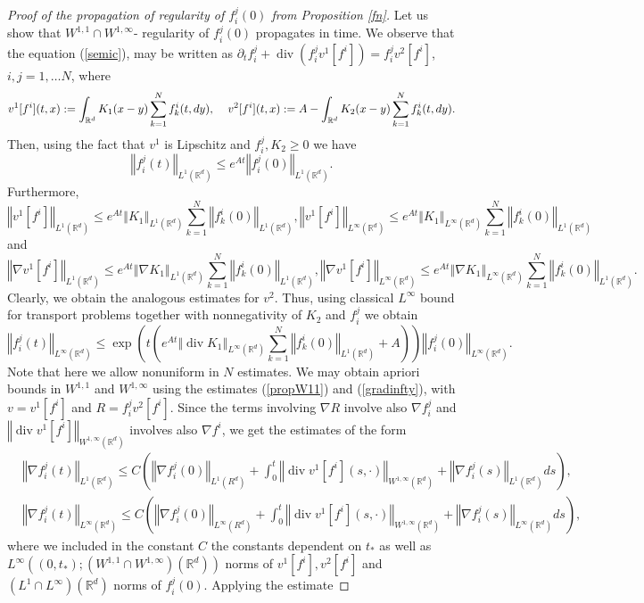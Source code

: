 \documentclass[10pt]{article}
\def\divv{\operatorname {div}}
\newcommand{\hd}{\hspace{0.2cm}}
\newcommand*{\norm}[1]{\left\Vert{#1}\right\Vert}
\newcommand{\R}{\mathbb{R}}
\newcommand{\ird}{\int_{\mathbb{R}^d}}
\begin{document}
\begin{proof}[Proof of the propagation of regularity of $f^j_i(0)$ from Proposition \ref{fn}]
 Let us show that $W^{1,1}\cap W^{1,\infty}$- regularity of $f^j_i(0)$ propagates in time.  We observe that the equation (\ref{semic}),   may be written as $\partial_t f_i^j + \divv (f_i^j v^1[f^i]) = f_i^j v^2[f^i]$, $i,j=1,\dots N$, where
\[
v^1[f^i](t,x) :=  \ird K_{1}(x-y)\sum_{k=1}^Nf_k^i(t,dy), \hd \hd  v^2[f^i](t,x):= A - \ird K_{2}(x-y)\sum_{k=1}^Nf_k^i(t,dy).
\]
Then, using the fact that $v^1$ is Lipschitz and $f_i^j, K_2 \geq 0$ we have
\[
\norm{f^j_i(t)}_{L^{1}(\R^d)}\leq e^{At}\norm{f^j_i(0)}_{L^{1}(\R^d)}.
\]
Furthermore, 
\[
\norm{v^1[f^i]}_{L^1(\R^d)} \leq e^{At}\norm{K_1}_{L^{1}(\R^d)}\sum_{k=1}^N\norm{f^i_k(0)}_{L^{1}(\R^d)},  \norm{v^1[f^i]}_{L^\infty(\R^d)} \leq e^{At}\norm{K_1}_{L^{\infty}(\R^d)}\sum_{k=1}^N\norm{f^i_k(0)}_{L^{1}(\R^d)}
\]
and
\[
\norm{\nabla v^1[f^i]}_{L^1(\R^d)} \leq e^{At}\norm{\nabla K_1}_{L^{1}(\R^d)}\sum_{k=1}^N\norm{f^i_k(0)}_{L^{1}(\R^d)},   \norm{\nabla v^1[f^i]}_{L^\infty(\R^d)} \leq e^{At}\norm{\nabla K_1}_{L^{\infty}(\R^d)}\sum_{k=1}^N\norm{f^i_k(0)}_{L^{1}(\R^d)}.
\]
Clearly, we obtain the analogous estimates for $v^2$. Thus, using classical $L^{\infty}$ bound for transport problems together with nonnegativity of $K_2$ and $f^j_i$ we obtain 
\[
\norm{f_i^j(t)}_{L^{\infty}(\R^d)}\leq \exp\left(t\left( e^{At}\norm{\divv K_1}_{L^{\infty}(\R^d)}\sum_{k=1}^N\norm{f^i_k(0)}_{L^{1}(\R^d)} + A\right)\right)\norm{f^j_i(0)}_{L^{\infty}(\R^d)}.
\]
Note that here we allow nonuniform in $N$ estimates. 
We may obtain apriori bounds in $W^{1,1}$ and $W^{1,\infty}$   using the estimates (\ref{propW11}) and (\ref{gradinfty}), with $v=v^1[f^i]$ and $R =f^j_i v^2[f^i]$.
Since the terms involving $\nabla R$ involve also $\nabla f^j_i$ and $\norm{\divv v^1[f^i]}_{W^{1,\infty}(\R^d)}$ involves also $\nabla f^i$, we get the estimates of the form
\begin{align*}
&\norm{\nabla f^j_i(t)}_{L^{1}(\R^d)}\leq C\left(\norm{\nabla f^j_i(0)}_{L^{1}(R^d)} + \int_{0}^t \norm{\divv v^1[f^i](s,\cdot)}_{W^{1,\infty}(\R^d)} + \norm{\nabla f^j_i(s)}_{L^{1}(\R^d)}ds\right),\\ 
&\norm{\nabla f^j_i(t)}_{L^{\infty}(\R^d)}\leq C\left(\norm{\nabla f^j_i(0)}_{L^{\infty}(R^d)} + \int_{0}^t \norm{\divv v^1[f^i](s,\cdot)}_{W^{1,\infty}(\R^d)} + \norm{\nabla f^j_i(s)}_{L^{\infty}(\R^d)}ds\right),
\end{align*}
where we included in the constant $C$ the constants dependent on $t_{*}$ as well as $L^{\infty}((0,t_{*});(W^{1,1}\cap W^{1,\infty})(\R^d))$ norms of $v^1[f^i],v^2[f^i]$ and $(L^1\cap L^{\infty})(\R^d)$ norms of $f^j_i(0)$. Applying the estimate 

\end{proof}
\end{document}
